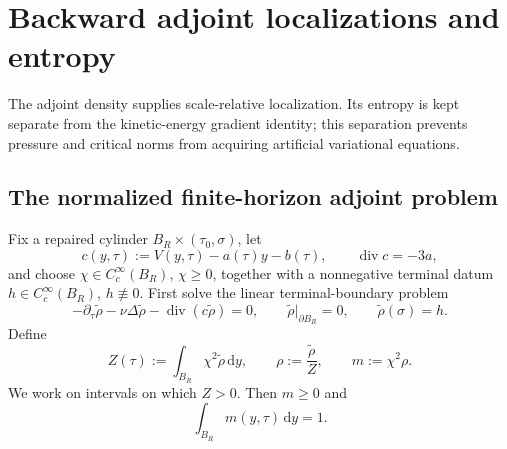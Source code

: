 \documentclass[11pt]{amsart}
\numberwithin{equation}{section}
\theoremstyle{plain}
\theoremstyle{definition}
\theoremstyle{remark}
\newcommand{\dd}{\,\mathrm d}
\newcommand{\diver}{\operatorname{div}}
\begin{document}
\section{Backward adjoint localizations and entropy}
\label{sec:adjoint}

The adjoint density supplies scale-relative localization.  Its entropy is
kept separate from the kinetic-energy gradient identity; this separation
prevents pressure and critical norms from acquiring artificial variational
equations.

\subsection{The normalized finite-horizon adjoint problem}

Fix a repaired cylinder \(B_R\times(\tau_0,\sigma)\), let
\begin{equation}\label{eq:transport-drift}
 c(y,\tau):=V(y,\tau)-a(\tau)y-b(\tau),
 \qquad \diver c=-3a,
\end{equation}
and choose \(\chi\in C_c^\infty(B_R)\), \(\chi\ge0\), together with a
nonnegative terminal datum \(h\in C_c^\infty(B_R)\), \(h\not\equiv0\).
First solve the linear terminal-boundary problem
\begin{equation}\label{eq:unnormalized-adjoint}
 -\partial_\tau\widetilde\rho-\nu\Delta\widetilde\rho
 -\diver(c\widetilde\rho)=0,
 \qquad
 \widetilde\rho|_{\partial B_R}=0,
 \qquad
 \widetilde\rho(\sigma)=h.
\end{equation}
Define
\begin{equation}\label{eq:adjoint-normalization}
 Z(\tau):=\int_{B_R}\chi^2\widetilde\rho\dd y,
 \qquad
 \rho:=\frac{\widetilde\rho}{Z},
 \qquad
 m:=\chi^2\rho.
\end{equation}
We work on intervals on which \(Z>0\).  Then \(m\ge0\) and
\begin{equation}\label{eq:m-normalized}
 \int_{B_R}m(y,\tau)\dd y=1.
\end{equation}
\end{document}
